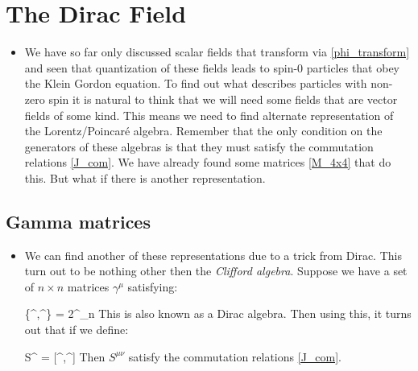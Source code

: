 \documentclass[11pt]{article}
\renewenvironment{flalign}{\vspace{-3mm}\empheq[box=\tcbhighmath]{align}}{\endempheq}
\numberwithin{equation}{section}
\begin{document}
\section{The Dirac Field}
\begin{itemize}
  \item We have so far only discussed scalar fields that transform via \ref{phi_transform} and seen that quantization of these fields leads to spin-0 particles that obey the Klein Gordon equation. To find out what describes particles with non-zero spin it is natural to think that we will need some fields that are vector fields of some kind. This means we need to find alternate representation of the Lorentz/Poincar\'e algebra. Remember that the only condition on the generators of these algebras is that they must satisfy the commutation relations \ref{J_com}. We have already found some matrices \ref{M_4x4} that do this. But what if there is another representation.   
\end{itemize}

\subsection{Gamma matrices}
\begin{itemize}
  \item We can find another of these representations due to a trick from Dirac. This turn out to be nothing other then the \emph{Clifford algebra}. Suppose  we have a set of $n\times n$ matrices $\gamma^{\mu}$ satisfying: 

  \begin{flalign}
  \label{gamma_def}
    \{\gamma^{\mu},\gamma^{\nu}\} = 2\eta^{\mu\nu}_{n}
  \end{flalign}
  This is also known as a Dirac algebra. Then using this, it turns out that if we define: 

  \begin{flalign}
  \label{S_def}
    S^{\mu\nu} = [\gamma^{\mu},\gamma^{\nu}]
  \end{flalign}
  Then $S^{\mu\nu}$ satisfy the commutation relations \ref{J_com}.  
\end{itemize}
\end{document}
